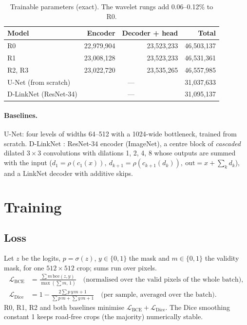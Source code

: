\documentclass[11pt]{article}
\begin{document}
\begin{table}[h]
\centering
\caption{Trainable parameters (exact). The wavelet rungs add 0.06--0.12\% to R0.}
\label{tab:params}
\begin{tabular}{@{}lrrr@{}}
\toprule
Model & Encoder & Decoder + head & Total \\
\midrule
R0 & 22{,}979{,}904 & 23{,}523{,}233 & 46{,}503{,}137 \\
R1 & 23{,}008{,}128 & 23{,}523{,}233 & 46{,}531{,}361 \\
R2, R3 & 23{,}022{,}720 & 23{,}535{,}265 & 46{,}557{,}985 \\
U-Net (from scratch) & \multicolumn{2}{c}{---} & 31{,}037{,}633 \\
D-LinkNet (ResNet-34) & \multicolumn{2}{c}{---} & 31{,}095{,}137 \\
\bottomrule
\end{tabular}
\end{table}

\paragraph{Baselines.} U-Net: four levels of widths 64--512 with a 1024-wide bottleneck, trained
from scratch. D-LinkNet \cite{zhou2018}: ResNet-34 encoder (ImageNet), a centre block of
\emph{cascaded} dilated $3\times3$ convolutions with dilations 1, 2, 4, 8 whose outputs are summed
with the input ($d_1 = \rho(c_1(x)),\ d_{k+1} = \rho(c_{k+1}(d_k)),\ \text{out} = x + \sum_k d_k$),
and a LinkNet decoder with additive skips.

\section{Training}
\label{sec:train}

\subsection{Loss}

Let $z$ be the logits, $p = \sigma(z)$, $y\in\{0,1\}$ the mask and $m\in\{0,1\}$ the validity mask,
for one $512\times512$ crop; sums run over pixels.
\begin{align}
  \mathcal{L}_{\mathrm{BCE}} &= \frac{\sum m\,\mathrm{bce}(z,y)}{\max(\sum m,\,1)}
  \quad\text{(normalised over the valid pixels of the whole batch)},\\
  \mathcal{L}_{\mathrm{Dice}} &= 1 - \frac{2\sum p\,y\,m + 1}{\sum p\,m + \sum y\,m + 1}
  \quad\text{(per sample, averaged over the batch)}.
\end{align}
R0, R1, R2 and both baselines minimise $\mathcal{L}_{\mathrm{BCE}} + \mathcal{L}_{\mathrm{Dice}}$.
The Dice smoothing constant 1 keeps road-free crops (the majority) numerically stable.
\end{document}
